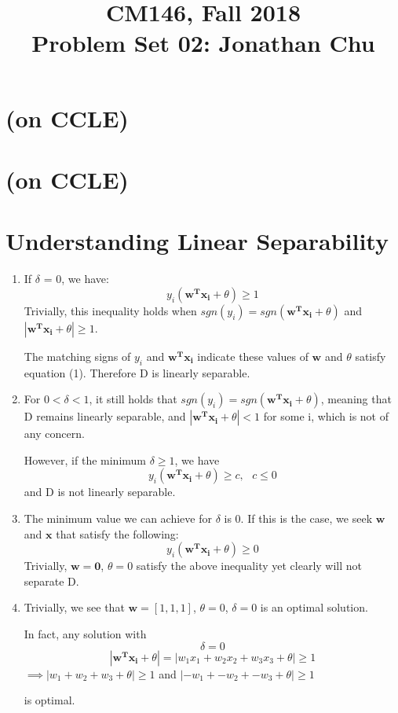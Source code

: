 \documentclass[11pt]{article}
\newcommand{\cnum}{CM146}
\newcommand{\ced}{Fall 2018}
\newcommand{\ctitle}[3]{\title{\vspace{-0.5in}\cnum, \ced\\Problem Set #1: #2}}
\newcommand{\solution}[1]{{{\color{black}{\bf Solution:} {#1}}}}
\begin{document}
\ctitle{02}{Jonathan Chu}
\date{}
\maketitle
\vspace{-0.75in}

\section{(on CCLE)}
\section{(on CCLE)}

\section{Understanding Linear Separability}
\begin{enumerate}
\item %
\solution{
If $\delta$ = 0, we have:
$$y_i(\boldsymbol{w^Tx_i}+\theta) \geq 1$$
Trivially, this inequality holds when $sgn(y_i) = sgn(\boldsymbol{w^Tx_i}+\theta)$ and $|\boldsymbol{w^Tx_i}+\theta| \geq 1$.

The matching signs of $y_i$ and $\boldsymbol{w^Tx_i}$ indicate these values of $\boldsymbol{w}$ and $\theta$ satisfy equation (1). Therefore D is linearly separable.
}

\item %
\solution{
For $0 < \delta < 1$, it still holds that $sgn(y_i) = sgn(\boldsymbol{w^Tx_i}+\theta)$, meaning that D remains linearly separable, and $|\boldsymbol{w^Tx_i}+\theta| < 1$ for some i, which is not of any concern.

However, if the minimum $\delta \geq 1$, we have
$$y_i(\boldsymbol{w^Tx_i}+\theta) \geq c, \text{ } c \leq 0$$
and D is not linearly separable.
}

\item %
\solution{
The minimum value we can achieve for $\delta$ is 0. If this is the case, we seek $\boldsymbol{w}$ and $\boldsymbol{x}$ that satisfy the following:
$$y_i(\boldsymbol{w^Tx_i}+\theta) \geq 0$$
Trivially, $\boldsymbol{w} = \boldsymbol{0}$, $\theta = 0$ satisfy the above inequality yet clearly will not separate D.
}

\item %
\solution{
Trivially, we see that $\boldsymbol{w}=[1, 1, 1]$, $\theta=0$, $\delta=0$ is an optimal solution.

In fact, any solution with 
$$\delta = 0$$ 
$$|\boldsymbol{w^Tx_i}+\theta| = |w_1x_1 + w_2x_2 + w_3x_3 + \theta| \geq 1$$
$\implies |w_1 + w_2 + w_3 + \theta| \geq 1$ and $|-w_1 + -w_2 + -w_3 + \theta| \geq 1$

is optimal.

 
}

\end{enumerate}
\end{document}
